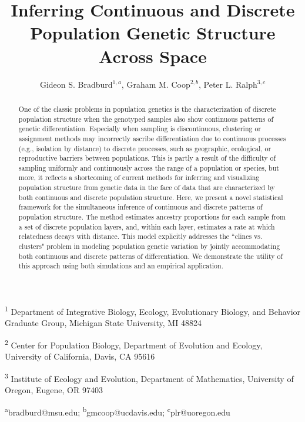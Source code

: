 \documentclass[12pt]{article}
\title{Inferring Continuous and Discrete Population Genetic Structure Across Space}
\date{\vspace{-5ex}}
\author{
Gideon S. Bradburd$^{1,a}$, 
Graham M. Coop$^{2,b}$,
Peter L. Ralph$^{3,c}$}
\begin{document}
\maketitle

\textsuperscript{1}
Department of Integrative Biology, 
Ecology, Evolutionary Biology, and Behavior Graduate Group,
Michigan State University, MI 48824

\textsuperscript{2}
Center for Population Biology,
Department of Evolution and Ecology, 
University of California, Davis, CA 95616

\textsuperscript{3}
Institute of Ecology and Evolution,
Department of Mathematics,
University of Oregon, Eugene, OR 97403

\textsuperscript{a}bradburd@msu.edu; 
\textsuperscript{b}gmcoop@ucdavis.edu;
\textsuperscript{c}plr@uoregon.edu\\\\\

\newpage
 

\begin{abstract}
One of the classic problems in population genetics is the characterization 
of discrete population structure when the genotyped samples also show 
continuous patterns of genetic differentiation.
Especially when sampling is discontinuous, 
clustering or assignment methods may incorrectly ascribe differentiation 
due to continuous processes (e.g., isolation by distance) 
to discrete processes, such as geographic, ecological, or reproductive barriers 
between populations.
This is partly a result of the difficulty of sampling uniformly and continuously 
across the range of a population or species, 
but more, it reflects a shortcoming of current methods for inferring and 
visualizing population structure from genetic data in the face of data 
that are characterized by both continuous and discrete population structure.
Here, we present a novel statistical framework for the simultaneous inference 
of continuous and discrete patterns of population structure.
The method estimates ancestry proportions for each 
sample from a set of discrete population layers, 
and, within each layer, estimates a rate at which relatedness decays with distance.
This model explicitly addresses the ``clines vs. clusters" problem in 
modeling population genetic variation by jointly accommodating both 
continuous and discrete patterns of differentiation. 
We demonstrate the utility of this approach using both simulations and an empirical application.
\end{abstract}
\end{document}
